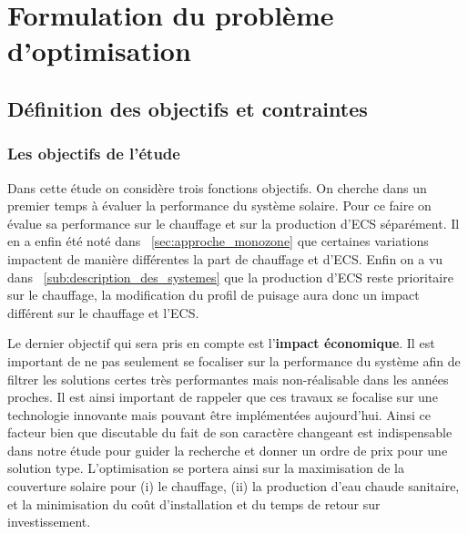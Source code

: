 \section{Formulation du problème d’optimisation} %
\label{sec:formulation_du_probleme_d_optimisation}
\subsection{Définition des objectifs et contraintes} %
\label{sub:definition_des_objectifs_et_contraintes}
\subsubsection{Les objectifs de l’étude} %
\label{ssub:les_objectifs_de_l_etude}
Dans cette étude on considère trois fonctions objectifs. On cherche dans un premier
temps à évaluer la performance du système solaire. Pour ce faire on évalue sa
performance sur le chauffage et sur la production d’ECS séparément. Il en a enfin
été noté dans ~\autoref{sec:approche_monozone} que certaines variations impactent
de manière différentes la part de chauffage et d’ECS. Enfin on a vu dans
~\autoref{sub:description_des_systemes} que la production d’ECS reste prioritaire
sur le chauffage, la modification du profil de puisage aura donc un impact différent
sur le chauffage et l’ECS.

Le dernier objectif qui sera pris en compte est l’\textbf{impact économique}. Il
est important de ne pas seulement se focaliser sur la performance du système afin
de filtrer les solutions certes très performantes mais non-réalisable dans les années
proches. Il est ainsi important de rappeler que ces travaux se focalise sur une
technologie innovante mais pouvant être implémentées aujourd’hui.
Ainsi ce facteur bien que discutable du fait de son caractère changeant est indispensable
dans notre étude pour guider la recherche et donner un ordre de prix pour une solution
type.
L’optimisation se portera ainsi sur la maximisation de la couverture solaire pour
(i) le chauffage, (ii) la production d’eau chaude sanitaire, et la minimisation
du coût d’installation et du temps de retour sur investissement.


